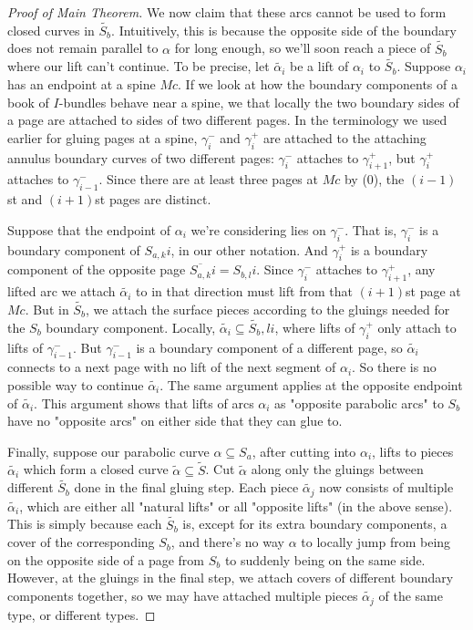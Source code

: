 \documentclass[12pt]{amsart}
\theoremstyle{definition}
\theoremstyle{remark}
\newcommand{\cin}{\subseteq}
\begin{document}
\begin{proof}[Proof of Main Theorem]
We now claim that these arcs cannot be used to form closed curves in $\widetilde{S_b}$.
Intuitively, this is because the opposite side of the boundary does not remain
parallel to $\alpha$ for long enough, so we'll soon reach a piece of $\widetilde{S_b}$
where our lift can't continue.  To be precise, let $\widetilde{\alpha_i}$ be a lift of
$\alpha_i$ to $\widetilde{S_b}$.  Suppose $\alpha_i$ has an endpoint at a spine $Mc$. If we
look at how the boundary components of a book of $I$-bundles behave near
a spine, we that locally the two boundary sides of a page are attached to sides
of two different pages.  In the terminology we used earlier for gluing pages at
a spine, $\gamma_i^-$ and $\gamma_i^+$ are attached to the attaching annulus boundary
curves of two different pages: $\gamma_i^-$ attaches to $\gamma_{i+1}^+$, but
$\gamma_i^+$ attaches to $\gamma_{i-1}^-$.  Since there are at least three pages at
$Mc$ by (0), the $(i-1)$st and $(i+1)$st pages are distinct.

Suppose that the endpoint of $\alpha_i$ we're considering lies on $\gamma_i^-$. That
is, $\gamma_i^-$ is a boundary component of $S_{a,k}i$, in our other notation. And
$\gamma_i^+$ is a boundary component of the opposite page $\overline{S_{a,k}}i = S_{b,l}i$.
Since $\gamma_i^-$ attaches to $\gamma_{i+1}^+$, any lifted arc we attach
$\widetilde{\alpha_i}$ to in that direction must lift from that $(i+1)$st page at $Mc$.
But in $\widetilde{S_b}$, we attach the surface pieces according to the gluings needed
for the $S_b$ boundary component.  Locally, $\widetilde{\alpha_i} \cin \widetilde{S_b},li$, where
lifts of $\gamma_i^+$ only attach to lifts of $\gamma_{i-1}^-$. But $\gamma_{i-1}^-$ is
a boundary component of a different page, so $\widetilde{\alpha_i}$ connects to a next
page with no lift of the next segment of $\alpha_i$. So there is no possible way
to continue $\widetilde{\alpha_i}$.  The same argument applies at the opposite endpoint
of $\widetilde{\alpha_i}$. This argument shows that lifts of arcs $\alpha_i$ as "opposite
parabolic arcs" to $S_b$ have no "opposite arcs" on either side that they can
glue to.

Finally, suppose our parabolic curve $\alpha \cin S_a$, after cutting into
$\alpha_i$, lifts to pieces $\widetilde{\alpha_i}$ which form a closed curve $\widetilde{\alpha}
\cin \widetilde{S}$.  Cut $\widetilde{\alpha}$ along only the gluings between different
$\widetilde{S_b}$ done in the final gluing step. Each piece $\widetilde{\alpha_j}$ now consists
of multiple $\widetilde{\alpha_i}$, which are either all "natural lifts" or all
"opposite lifts" (in the above sense). This is simply because each $\widetilde{S_b}$
is, except for its extra boundary components, a cover of the corresponding
$S_b$, and there's no way $\alpha$ to locally jump from being on the opposite
side of a page from $S_b$ to suddenly being on the same side. However, at the
gluings in the final step, we attach covers of different boundary components
together, so we may have attached multiple pieces $\widetilde{\alpha_j}$ of the same
type, or different types.


\end{proof}
\end{document}
